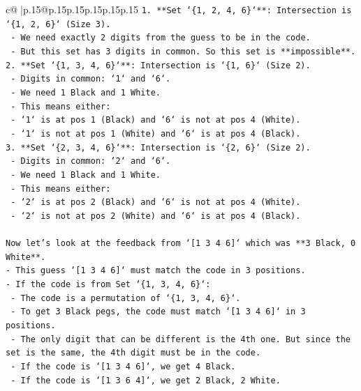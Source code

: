 \documentclass{article}
\begin{document}
{\begin{supertabular}{c@{$\;$}|p{.15\linewidth}@{}p{.15\linewidth}p{.15\linewidth}p{.15\linewidth}p{.15\linewidth}p{.15\linewidth}}
{{{\texttt{1.  **Set `\{1, 2, 4, 6\}`**: Intersection is `\{1, 2, 6\}` (Size 3).} \\
\texttt{    {-}   We need exactly 2 digits from the guess to be in the code.} \\
\texttt{    {-}   But this set has 3 digits in common. So this set is **impossible**.} \\
\texttt{2.  **Set `\{1, 3, 4, 6\}`**: Intersection is `\{1, 6\}` (Size 2).} \\
\texttt{    {-}   Digits in common: `1` and `6`.} \\
\texttt{    {-}   We need 1 Black and 1 White.} \\
\texttt{    {-}   This means either:} \\
\texttt{        {-}   `1` is at pos 1 (Black) and `6` is not at pos 4 (White).} \\
\texttt{        {-}   `1` is not at pos 1 (White) and `6` is at pos 4 (Black).} \\
\texttt{3.  **Set `\{2, 3, 4, 6\}`**: Intersection is `\{2, 6\}` (Size 2).} \\
\texttt{    {-}   Digits in common: `2` and `6`.} \\
\texttt{    {-}   We need 1 Black and 1 White.} \\
\texttt{    {-}   This means either:} \\
\texttt{        {-}   `2` is at pos 2 (Black) and `6` is not at pos 4 (White).} \\
\texttt{        {-}   `2` is not at pos 2 (White) and `6` is at pos 4 (Black).} \\
\\ 
\texttt{Now let's look at the feedback from `{[}1 3 4 6{]}` which was **3 Black, 0 White**.} \\
\texttt{{-}   This guess `{[}1 3 4 6{]}` must match the code in 3 positions.} \\
\texttt{{-}   If the code is from Set `\{1, 3, 4, 6\}`:} \\
\texttt{    {-}   The code is a permutation of `\{1, 3, 4, 6\}`.} \\
\texttt{    {-}   To get 3 Black pegs, the code must match `{[}1 3 4 6{]}` in 3 positions.} \\
\texttt{    {-}   The only digit that can be different is the 4th one. But since the set is the same, the 4th digit must be in the code.} \\
\texttt{    {-}   If the code is `{[}1 3 4 6{]}`, we get 4 Black.} \\
\texttt{    {-}   If the code is `{[}1 3 6 4{]}`, we get 2 Black, 2 White.} \\
}}}
\end{supertabular}}
\end{document}
